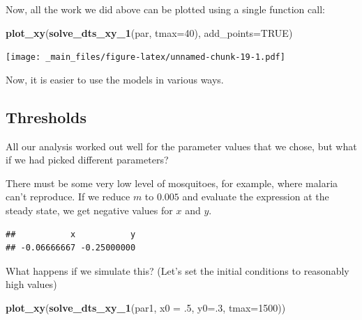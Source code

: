 \documentclass[
]{book}
\newenvironment{Shaded}{\begin{snugshade}}{\end{snugshade}}
\newcommand{\AttributeTok}[1]{\textcolor[rgb]{0.13,0.29,0.53}{#1}}
\newcommand{\ConstantTok}[1]{\textcolor[rgb]{0.56,0.35,0.01}{#1}}
\newcommand{\DecValTok}[1]{\textcolor[rgb]{0.00,0.00,0.81}{#1}}
\newcommand{\FloatTok}[1]{\textcolor[rgb]{0.00,0.00,0.81}{#1}}
\newcommand{\FunctionTok}[1]{\textcolor[rgb]{0.13,0.29,0.53}{\textbf{#1}}}
\newcommand{\NormalTok}[1]{#1}
\newcommand{\OtherTok}[1]{\textcolor[rgb]{0.56,0.35,0.01}{#1}}
\newcommand{\SpecialCharTok}[1]{\textcolor[rgb]{0.81,0.36,0.00}{\textbf{#1}}}
\begin{document}
Now, all the work we did above can be plotted using a single function call:

\begin{Shaded}
\begin{Highlighting}[]
\FunctionTok{plot\_xy}\NormalTok{(}\FunctionTok{solve\_dts\_xy\_1}\NormalTok{(par, }\AttributeTok{tmax=}\DecValTok{40}\NormalTok{), }\AttributeTok{add\_points=}\ConstantTok{TRUE}\NormalTok{) }
\end{Highlighting}
\end{Shaded}

\texttt{[image: \_main\_files/figure-latex/unnamed-chunk-19-1.pdf]}

Now, it is easier to use the models in various ways.

\subsection{Thresholds}\label{thresholds}

All our analysis worked out well for the parameter values that we chose, but what if we had picked different parameters?

There must be some very low level of mosquitoes, for example, where malaria can't reproduce. If we reduce \(m\) to \(0.005\) and evaluate the expression at the steady state, we get negative values for \(x\) and \(y\).

\begin{Shaded}
\end{Shaded}

\begin{verbatim}
##           x           y 
## -0.06666667 -0.25000000
\end{verbatim}

What happens if we simulate this? (Let's set the initial conditions to reasonably high values)

\begin{Shaded}
\begin{Highlighting}[]
\FunctionTok{plot\_xy}\NormalTok{(}\FunctionTok{solve\_dts\_xy\_1}\NormalTok{(par1, }\AttributeTok{x0 =}\NormalTok{ .}\DecValTok{5}\NormalTok{, }\AttributeTok{y0=}\NormalTok{.}\DecValTok{3}\NormalTok{, }\AttributeTok{tmax=}\DecValTok{1500}\NormalTok{)) }
\end{Highlighting}
\end{Shaded}
\end{document}
